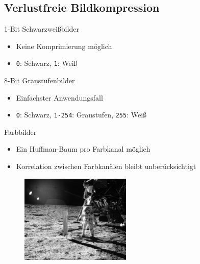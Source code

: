 \documentclass[xcolor=dvipsnames,presentation]{beamer}    %
\newenvironment{witemize}{\itemize\setlength{\itemsep}{1em}}{\enditemize}
\begin{document}
\subsection{Verlustfreie Bildkompression}

\begin{frame}{\insertsubsection}
\begin{witemize}
\item<1-> 1-Bit Schwarzweißbilder
  \begin{itemize}
    \item Keine Komprimierung möglich
    \item {\tt0}: Schwarz, {\tt1}: Weiß
  \end{itemize}

\item<2-> 8-Bit Graustufenbilder
  \begin{itemize}
    \item Einfachster Anwendungsfall
    \item {\tt0}: Schwarz, {\tt1-254}: Graustufen, {\tt255}: Weiß
  \end{itemize}

\item<3-> Farbbilder
  \begin{itemize}
    \item Ein Huffman-Baum pro Farbkanal möglich
    \item Korrelation zwischen Farbkanälen bleibt unberücksichtigt
  \end{itemize}
\end{witemize}
\end{frame}

\begin{frame}{\insertsubsection}
\begin{figure}[T]
  \centering
  \includegraphics[width=0.470\textwidth]{bilder/moon.jpg}
  \hfill
\end{figure}
\end{frame}
\end{document}
